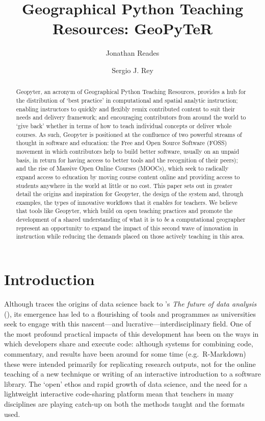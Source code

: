 \documentclass[letter, 11pt,titlepage]{article}
\title{Geographical Python Teaching Resources: GeoPyTeR}
\author{Jonathan Reades \and Sergio J. Rey}
\newcommand{\eg}{e.g.~\/}
\begin{document}
\maketitle

\begin{abstract}
Geopyter, an acronym of Geographical Python Teaching Resources, provides
a hub for the distribution of `best practice' in computational and
spatial analytic instruction; enabling instructors to quickly and
flexibly remix contributed content to suit their needs and delivery
framework; and encouraging contributors from around the world to `give
back' whether in terms of how to teach individual concepts or deliver
whole courses. As such, Geopyter is positioned at the confluence of two
powerful streams of thought in software and education: the Free and Open
Source Software (FOSS) movement in which contributors help to build
better software, usually on an unpaid basis, in return for having access
to better tools and the recognition of their peers); and the rise of
Massive Open Online Courses (MOOCs), which seek to radically expand
access to education by moving course content online and providing access
to students anywhere in the world at little or no cost. This paper sets
out in greater detail the origins and inspiration for Geopyter, the
design of the system and, through examples, the types of innovative
workflows that it enables for teachers. We believe that tools like
Geopyter, which build on open teaching practices and promote the
development of a shared understanding of what it is to \emph{be} a
computational geographer represent an opportunity to expand the impact
of this second wave of innovation in instruction while reducing the
demands placed on those actively teaching in this area.
\end{abstract}


\section{Introduction}\label{introduction}

Although \citet{Donoho2017} traces the origins of data science back to
\citeauthor{Tukey1962}'s \textit{The future of data analysis}
(\citeyear{Tukey1962}), its emergence has led to a flourishing of tools and
programmes as universities seek to engage with this nascent---and
lucrative---interdisciplinary field. One of the most profound practical impacts
of this development has been on the ways in which developers share and execute
code: although systems for combining code, commentary, and results have been
around for some time (\eg R-Markdown) these were intended primarily for
replicating research outputs, not for the online teaching of a new technique or
writing of an interactive introduction to a software library. The `open' ethos
and rapid growth of data science, and the need for a lightweight interactive
code-sharing platform mean that teachers in many disciplines are playing
catch-up on both the methods taught and the formats used.
\end{document}
